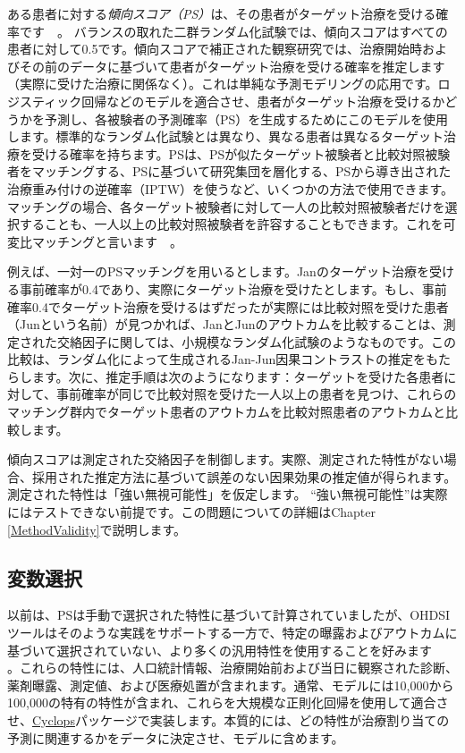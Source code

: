 \documentclass[
  11pt]{book}
\theoremstyle{definition}
\theoremstyle{definition}
\theoremstyle{definition}
\theoremstyle{definition}
\theoremstyle{remark}
\begin{document}
ある患者に対する\emph{傾向スコア（PS）}は、その患者がターゲット治療を受ける確率です　\citep{rosenbaum_1983}。 バランスの取れた二群ランダム化試験では、傾向スコアはすべての患者に対して0.5です。傾向スコアで補正された観察研究では、治療開始時およびその前のデータに基づいて患者がターゲット治療を受ける確率を推定します（実際に受けた治療に関係なく）。これは単純な予測モデリングの応用です。ロジスティック回帰などのモデルを適合させ、患者がターゲット治療を受けるかどうかを予測し、各被験者の予測確率（PS）を生成するためにこのモデルを使用します。標準的なランダム化試験とは異なり、異なる患者は異なるターゲット治療を受ける確率を持ちます。PSは、PSが似たターゲット被験者と比較対照被験者をマッチングする、PSに基づいて研究集団を層化する、PSから導き出された治療重み付けの逆確率（IPTW）を使うなど、いくつかの方法で使用できます。マッチングの場合、各ターゲット被験者に対して一人の比較対照被験者だけを選択することも、一人以上の比較対照被験者を許容することもできます。これを可変比マッチングと言います　\citep{rassen_2012}。      

例えば、一対一のPSマッチングを用いるとします。Janのターゲット治療を受ける事前確率が0.4であり、実際にターゲット治療を受けたとします。もし、事前確率0.4でターゲット治療を受けるはずだったが実際には比較対照を受けた患者（Junという名前）が見つかれば、JanとJunのアウトカムを比較することは、測定された交絡因子に関しては、小規模なランダム化試験のようなものです。この比較は、ランダム化によって生成されるJan-Jun因果コントラストの推定をもたらします。次に、推定手順は次のようになります：ターゲットを受けた各患者に対して、事前確率が同じで比較対照を受けた一人以上の患者を見つけ、これらのマッチング群内でターゲット患者のアウトカムを比較対照患者のアウトカムと比較します。

傾向スコアは測定された交絡因子を制御します。実際、測定された特性がない場合、採用された推定方法に基づいて誤差のない因果効果の推定値が得られます。測定された特性は「強い無視可能性」を仮定します。 ``強い無視可能性''は実際にはテストできない前提です。この問題についての詳細はChapter \ref{MethodValidity}で説明します。 

\subsection{変数選択}\label{VariableSelection}

以前は、PSは手動で選択された特性に基づいて計算されていましたが、OHDSIツールはそのような実践をサポートする一方で、特定の曝露およびアウトカムに基づいて選択されていない、より多くの汎用特性を使用することを好みます　\citep{tian_2018} 。これらの特性には、人口統計情報、治療開始前および当日に観察された診断、薬剤曝露、測定値、および医療処置が含まれます。通常、モデルには10,000から100,000の特有の特性が含まれ、これらを大規模な正則化回帰\citep{suchard_2013}を使用して適合させ、\href{https://ohdsi.github.io/Cyclops/}{Cyclops}パッケージで実装します。本質的には、どの特性が治療割り当ての予測に関連するかをデータに決定させ、モデルに含めます。
\end{document}
